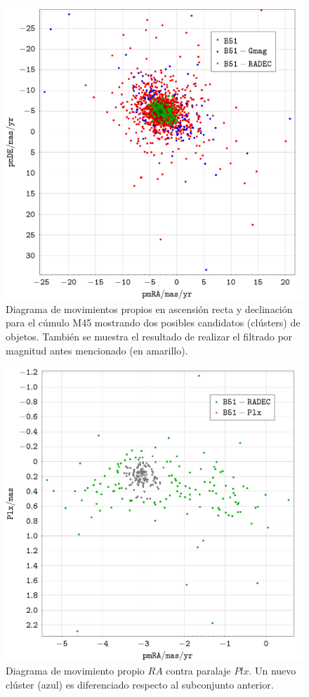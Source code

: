 \documentclass[a4paper,fleqn,usenatbib]{mnras}
\begin{document}
\begin{figure}
  \includegraphics[width=\linewidth]{img/b51_radec}
  \caption{Diagrama de movimientos propios en ascensión recta y declinación para el cúmulo M45 mostrando dos posibles candidatos (clústers) de objetos. También se muestra el resultado de realizar el filtrado por magnitud antes mencionado (en amarillo).}
  \label{fig:e2_b51_radec}
\end{figure}

\begin{figure}
  \includegraphics[width=\linewidth]{img/b51_plx}
  \caption{Diagrama de movimiento propio $RA$ contra paralaje $Plx$. Un nuevo clúster (azul) es diferenciado respecto al subconjunto anterior.}
  \label{fig:e2_b51_plx}
\end{figure}
\end{document}
